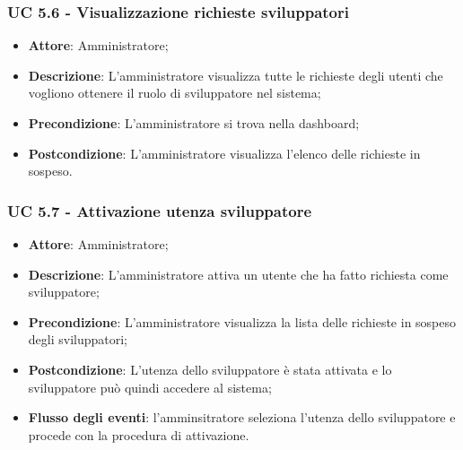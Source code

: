 \subsubsection{UC 5.6 - Visualizzazione richieste sviluppatori}
\begin{itemize}
\item \textbf{Attore}: Amministratore;
\item \textbf{Descrizione}: L'amministratore visualizza tutte le richieste degli utenti che vogliono ottenere il ruolo di sviluppatore nel sistema;
\item \textbf{Precondizione}: L'amministratore si trova nella dashboard;
\item \textbf{Postcondizione}: L'amministratore visualizza l'elenco delle richieste in sospeso.
\end{itemize}

\subsubsection{UC 5.7 - Attivazione utenza sviluppatore}
\begin{itemize}
\item \textbf{Attore}: Amministratore;
\item \textbf{Descrizione}: L'amministratore attiva un utente che ha fatto richiesta come sviluppatore;
\item \textbf{Precondizione}: L'amministratore visualizza la lista delle richieste in sospeso degli sviluppatori;
\item \textbf{Postcondizione}: L'utenza dello sviluppatore è stata attivata e lo sviluppatore può quindi accedere al sistema;
\item \textbf{Flusso degli eventi}: l'amminsitratore seleziona l'utenza dello sviluppatore e procede con la procedura di attivazione.
\end{itemize}


